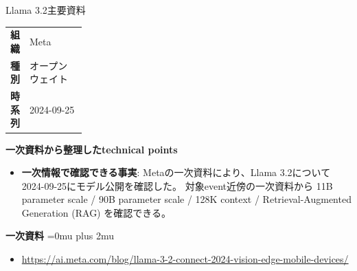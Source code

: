 \begin{technicalnote}{Llama 3.2}{主要資料}
\begingroup
\begin{tabularx}{\linewidth}{@{}>{\bfseries}p{0.22\linewidth}X@{}}
組織 & Meta \\
種別 & オープンウェイト \\
時系列 & 2024-09-25 \\
\end{tabularx}
\smallskip
{\bfseries 一次資料から整理したtechnical points}
\begin{itemize}[leftmargin=1.5em,itemsep=0.35em]
\item \textbf{一次情報で確認できる事実}: Metaの一次資料により、Llama 3.2について2024-09-25にモデル公開を確認した。 対象event近傍の一次資料から 11B parameter scale / 90B parameter scale / 128K context / Retrieval-Augmented Generation (RAG) を確認できる。
\end{itemize}
\begin{minipage}{\linewidth}
\begin{samepage}
{\bfseries 一次資料}
\begingroup\sloppy
\Urlmuskip=0mu plus 2mu\relax
\begin{itemize}[leftmargin=1.5em,itemsep=0.25em]
\item {\scriptsize\url{https://ai.meta.com/blog/llama-3-2-connect-2024-vision-edge-mobile-devices/}}
\end{itemize}
\endgroup
\end{samepage}
\end{minipage}
\endgroup
\end{technicalnote}
\medskip

